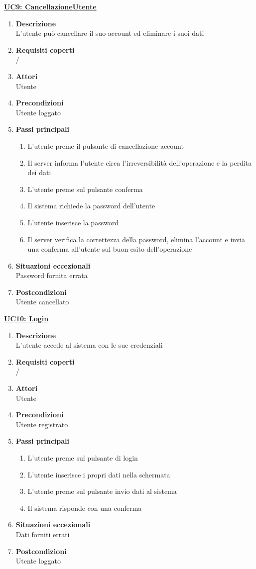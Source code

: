 \underline{\textbf{UC9: CancellazioneUtente}}
\begin{enumerate}
\item\textbf{Descrizione}\\
L'utente può cancellare il suo account ed eliminare i suoi dati
\item\textbf{Requisiti coperti}\\
/
\item\textbf{Attori}\\
Utente
\item\textbf{Precondizioni}\\ Utente loggato
\item\textbf{Passi principali}
\begin{enumerate}
\item L'utente preme il pulsante di cancellazione account
\item Il server informa l'utente circa l'irreversibilità dell'operazione e la perdita dei dati
\item L'utente preme sul pulsante conferma
\item Il sistema richiede la password dell'utente
\item L'utente inserisce la password
\item Il server verifica la correttezza della password, elimina l'account e invia una conferma all'utente sul buon esito dell'operazione
\end{enumerate}
\item\textbf{Situazioni eccezionali}\\
Password fornita errata
\item\textbf{Postcondizioni}\\
Utente cancellato
\end{enumerate}

\underline{\textbf{UC10: Login}}
\begin{enumerate}
\item\textbf{Descrizione}\\
L'utente accede al sistema con le sue credenziali
\item\textbf{Requisiti coperti}\\ /
\item\textbf{Attori}\\
Utente
\item\textbf{Precondizioni}\\ Utente registrato
\item\textbf{Passi principali}
\begin{enumerate}
\item L'utente preme sul pulsante di login
\item L'utente inserisce i propri dati nella schermata 
\item L'utente preme sul pulsante invio dati al sistema
\item Il sistema risponde con una conferma
\end{enumerate}
\item\textbf{Situazioni eccezionali}\\
Dati forniti errati
\item\textbf{Postcondizioni}\\
Utente loggato
\end{enumerate}

